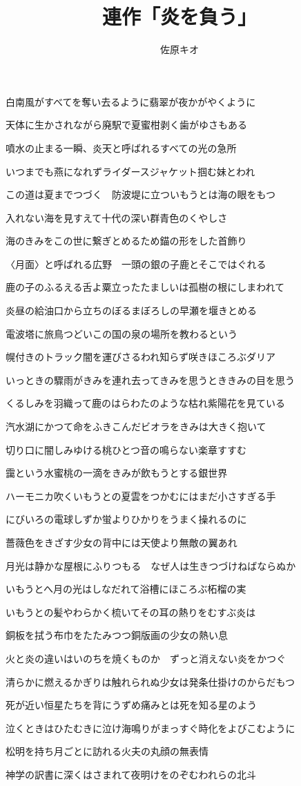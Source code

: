 \documentclass[b5j,twoside]{utarticle}
\title{\huge 連作「炎を負う」}
\author{\hspace{30mm} \Large  佐原キオ}
\date{\vspace{-5mm}}
\makeatletter
\def\yakuchu{%
\@ifnextchar[\@xfootnote %
{\stepcounter{yakuchu}%
\protected@xdef\@thefnmark{\theyakuchu}%
\@footnotemark\@footnotetext}}
\makeatother
\begin{document}
\fontsize{17pt}{17pt}\selectfont
\maketitle

\setlength{\footskip}{-2mm}
\chead[]{}
\rhead[連作「炎を負う」]{}
\lfoot[]{\thepage{}}
\cfoot[]{}
\rfoot[\thepage{}]{}

\let\yakuchu=\endnote
\renewcommand{\footnoterule}{\noindent\rule{100mm}{0.3mm}\vskip2mm}
\thispagestyle{fancy}
白南風がすべてを奪い去るように翡翠が夜かがやくように

天体に生かされながら廃駅で夏蜜柑剥く歯がゆさもある

噴水の止まる一瞬、炎天と呼ばれるすべての光の急所

いつまでも燕になれずライダースジャケット掴む妹とわれ

この道は夏までつづく　防波堤に立ついもうとは海の眼をもつ

入れない海を見すえて十代の深い群青色のくやしさ

海のきみをこの世に繋ぎとめるため錨の形をした首飾り

〈月面〉と呼ばれる広野　一頭の銀の子鹿とそこではぐれる

鹿の子のふるえる舌よ粟立ったたましいは孤樹の根にしまわれて

炎昼の給油口から立ちのぼるまぼろしの早瀬を堰きとめる

電波塔に旅鳥つどいこの国の泉の場所を教わるという

幌付きのトラック闇を運びさるわれ知らず咲きほころぶダリア

いっときの驟雨がきみを連れ去ってきみを思うとききみの目を思う

くるしみを羽織って鹿のはらわたのような枯れ紫陽花を見ている

汽水湖にかつて命をふきこんだビオラをきみは大きく抱いて

切り口に闇しみゆける桃ひとつ音の鳴らない楽章すすむ

靄という水蜜桃の一滴をきみが飲もうとする銀世界

ハーモニカ吹くいもうとの夏雲をつかむにはまだ小さすぎる手

にびいろの電球しずか蛍よりひかりをうまく操れるのに

薔薇色をきざす少女の背中には天使より無敵の翼あれ

月光は静かな屋根にふりつもる　なぜ人は生きつづけねばならぬか

いもうとへ月の光はしなだれて浴槽にほころぶ柘榴の実

いもうとの髪やわらかく梳いてその耳の熱りをむすぶ炎は

銅板を拭う布巾をたたみつつ銅版画の少女の熱い息

火と炎の違いはいのちを焼くものか　ずっと消えない炎をかつぐ

清らかに燃えるかぎりは触れられぬ少女は発条仕掛けのからだもつ

死が近い恒星たちを背にうずめ痛みとは死を知る星のよう

泣くときはひたむきに泣け海鳴りがまっすぐ時化をよびこむように

松明を持ち月ごとに訪れる火夫の丸顔の無表情

神学の訳書に深くはさまれて夜明けをのぞむわれらの北斗
\end{document}
